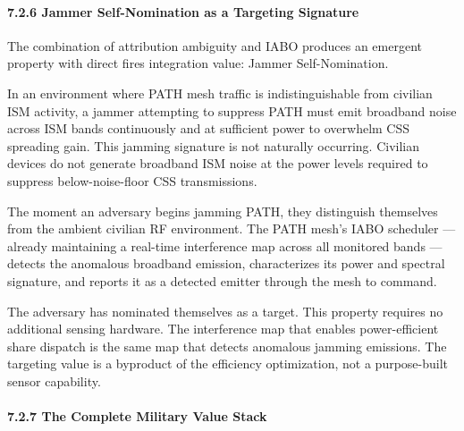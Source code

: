 \documentclass[
  11pt,
]{article}
\begin{document}
\hypertarget{jammer-self-nomination-as-a-targeting-signature}{%
\paragraph{7.2.6 Jammer Self-Nomination as a Targeting
Signature}\label{jammer-self-nomination-as-a-targeting-signature}}

The combination of attribution ambiguity and IABO produces an emergent
property with direct fires integration value: Jammer Self-Nomination.

In an environment where PATH mesh traffic is indistinguishable from
civilian ISM activity, a jammer attempting to suppress PATH must emit
broadband noise across ISM bands continuously and at sufficient power to
overwhelm CSS spreading gain. This jamming signature is not naturally
occurring. Civilian devices do not generate broadband ISM noise at the
power levels required to suppress below-noise-floor CSS transmissions.

The moment an adversary begins jamming PATH, they distinguish themselves
from the ambient civilian RF environment. The PATH mesh's IABO scheduler
--- already maintaining a real-time interference map across all
monitored bands --- detects the anomalous broadband emission,
characterizes its power and spectral signature, and reports it as a
detected emitter through the mesh to command.

The adversary has nominated themselves as a target. This property
requires no additional sensing hardware. The interference map that
enables power-efficient share dispatch is the same map that detects
anomalous jamming emissions. The targeting value is a byproduct of the
efficiency optimization, not a purpose-built sensor capability.

\hypertarget{the-complete-military-value-stack}{%
\paragraph{7.2.7 The Complete Military Value
Stack}\label{the-complete-military-value-stack}}
\end{document}
